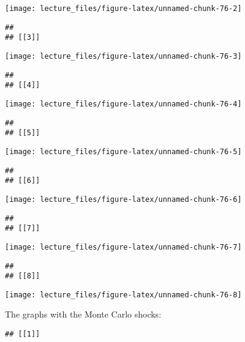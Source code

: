 \documentclass[
]{book}
\begin{document}
\begin{center}\texttt{[image: lecture\_files/figure-latex/unnamed-chunk-76-2]} \end{center}

\begin{verbatim}
## 
## [[3]]
\end{verbatim}

\begin{center}\texttt{[image: lecture\_files/figure-latex/unnamed-chunk-76-3]} \end{center}

\begin{verbatim}
## 
## [[4]]
\end{verbatim}

\begin{center}\texttt{[image: lecture\_files/figure-latex/unnamed-chunk-76-4]} \end{center}

\begin{verbatim}
## 
## [[5]]
\end{verbatim}

\begin{center}\texttt{[image: lecture\_files/figure-latex/unnamed-chunk-76-5]} \end{center}

\begin{verbatim}
## 
## [[6]]
\end{verbatim}

\begin{center}\texttt{[image: lecture\_files/figure-latex/unnamed-chunk-76-6]} \end{center}

\begin{verbatim}
## 
## [[7]]
\end{verbatim}

\begin{center}\texttt{[image: lecture\_files/figure-latex/unnamed-chunk-76-7]} \end{center}

\begin{verbatim}
## 
## [[8]]
\end{verbatim}

\begin{center}\texttt{[image: lecture\_files/figure-latex/unnamed-chunk-76-8]} \end{center}

The graphs with the Monte Carlo shocks:

\begin{verbatim}
## [[1]]
\end{verbatim}
\end{document}
